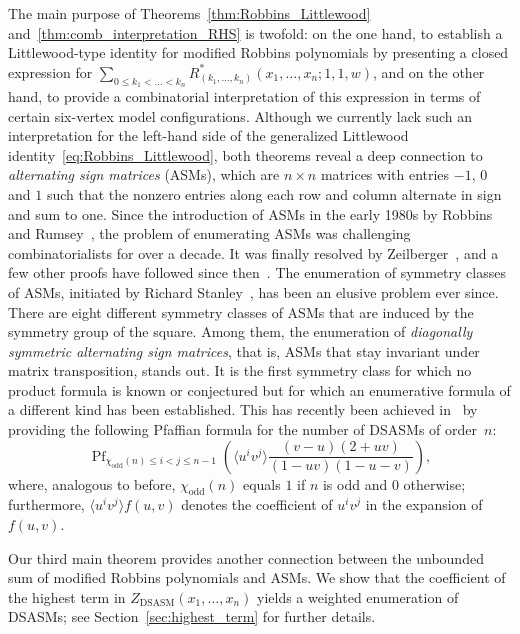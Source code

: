 \documentclass[ALCO, Unicode]{cedram}
\DeclareMathOperator{\DSASM}{DSASM}
\DeclareMathOperator*{\pf}{Pf}
\begin{document}
	The main purpose of Theorems~\ref{thm:Robbins_Littlewood} and~\ref{thm:comb_interpretation_RHS} is twofold: on the one hand, to establish a Littlewood-type identity for modified Robbins polynomials by presenting a closed expression for $\sum_{0 \le k_1 < \dots < k_n} R^{\ast}_{(k_{1},\ldots,k_{n})}(x_{1},\ldots,x_{n};1,1,w)$, and on the other hand, to provide a combinatorial interpretation of this expression in terms of certain six-vertex model configurations. Although we currently lack such an interpretation for the left-hand side of the generalized Littlewood identity~\eqref{eq:Robbins_Littlewood},
	both theorems reveal a deep connection to \emph{alternating sign matrices} (ASMs),  which are $n \times n$ matrices with entries $-1$, $0$ and $1$ such that the nonzero entries along each row and column alternate in sign and sum to one.
	Since the introduction of ASMs in the early 1980s by Robbins and Rumsey~\cite{RR86}, the problem of enumerating ASMs was challenging combinatorialists for over a decade. It was finally resolved by Zeilberger~\cite{Zei96}, and a few other proofs have followed since then~\cite{Kup96,Fis07}. The enumeration of symmetry classes of ASMs, initiated by Richard Stanley~\cite{Rob91,Rob}, has been an elusive problem ever since. There are eight different symmetry classes of ASMs that are induced by the symmetry group of the square. Among them, the enumeration of \emph{diagonally symmetric alternating sign matrices}, that is, ASMs that stay invariant under matrix transposition, stands out. It is the first symmetry class for which no product formula is known or conjectured but for which an enumerative formula of a different kind has been established. This has recently been achieved in~\cite[Corollary~4]{BFK23} by providing the following Pfaffian formula for the number of DSASMs of order~$n$:
	\begin{equation}\label{eq:DSASMs}
		\pf_{\chi_{\mathrm{odd}}(n) \le i < j \le n-1} \left(\langle u^i v^j\rangle \frac{(v-u)(2+u v)}{(1-u v)(1- u-v)} \right),
	\end{equation}
	where, analogous to before, $\chi_{\mathrm{odd}}(n)$ equals $1$ if $n$ is odd and $0$ otherwise; furthermore, $\langle u^i v^j \rangle f(u,v)$ denotes the coefficient of $u^i v^j$ in the expansion of $f(u,v)$.
	
	Our third main theorem provides another connection between the unbounded sum of modified Robbins polynomials and ASMs. We show that the coefficient of the highest term in $Z_{\DSASM} (x_1,\dots,x_n)$ yields a weighted enumeration of DSASMs; see Section~\ref{sec:highest_term} for further details.
	
\end{document}
